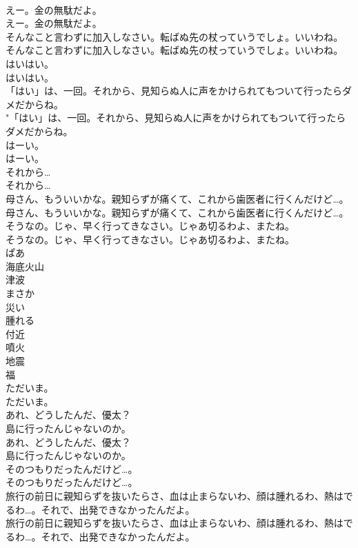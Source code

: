 \documentclass[8pt]{extreport}
\begin{document}
\begin{CJK}{UTF8}{min}
\\	えー。金の無駄だよ。	
\\	えー。金の無駄だよ。 
\\	そんなこと言わずに加入しなさい。転ばぬ先の杖っていうでしょ。いいわね。	
\\	そんなこと言わずに加入しなさい。転ばぬ先の杖っていうでしょ。いいわね。 
\\	はいはい。	
\\	はいはい。 
\\	「はい」は、一回。それから、見知らぬ人に声をかけられてもついて行ったらダメだからね。	
\\	"「はい」は、一回。それから、見知らぬ人に声をかけられてもついて行ったらダメだからね。 
\\	はーい。	
\\	はーい。 
\\	それから…	
\\	それから… 
\\	母さん、もういいかな。親知らずが痛くて、これから歯医者に行くんだけど…。	
\\	母さん、もういいかな。親知らずが痛くて、これから歯医者に行くんだけど…。 
\\	そうなの。じゃ、早く行ってきなさい。じゃあ切るわよ、またね。	
\\	そうなの。じゃ、早く行ってきなさい。じゃあ切るわよ、またね。 
\\	ぱあ
\\	海底火山
\\	津波
\\	まさか
\\	災い
\\	腫れる
\\	付近
\\	噴火
\\	地震
\\	福
\\	ただいま。	
\\	ただいま。 
\\	あれ、どうしたんだ、優太？
\\	島に行ったんじゃないのか。	
\\	あれ、どうしたんだ、優太？
\\	島に行ったんじゃないのか。 
\\	そのつもりだったんだけど…。	
\\	そのつもりだったんだけど…。 
\\	旅行の前日に親知らずを抜いたらさ、血は止まらないわ、顔は腫れるわ、熱はでるわ…。それで、出発できなかったんだよ。	
\\	旅行の前日に親知らずを抜いたらさ、血は止まらないわ、顔は腫れるわ、熱はでるわ…。それで、出発できなかったんだよ。 

\end{CJK}
\end{document}
